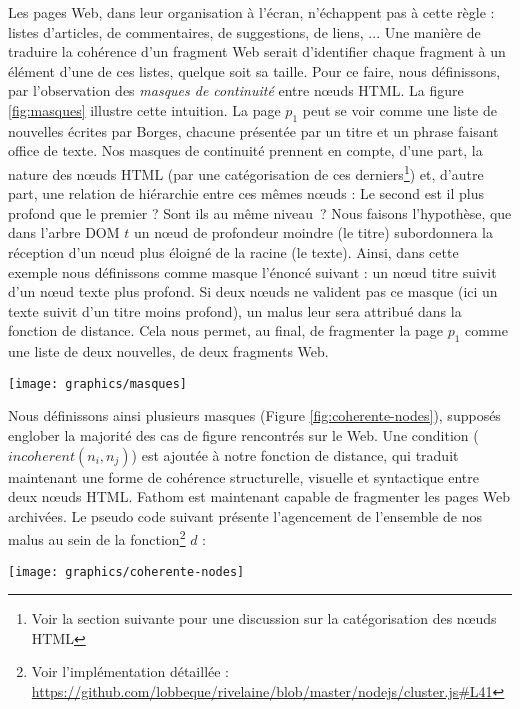 \documentclass[symmetric,justified,marginals=raggedouter]{tufte-book}
\begin{document}
Les pages Web, dans leur organisation à l'écran, n'échappent pas à cette règle : listes d'articles, de commentaires, de suggestions, de liens, ... Une manière de traduire la cohérence d'un fragment Web serait d'identifier chaque fragment à un élément d'une de ces listes, quelque soit sa taille. Pour ce faire, nous définissons, par l'observation des \textit{masques de continuité} entre nœuds HTML. La figure \ref{fig:masques} illustre cette intuition. La page $p_1$ peut se voir comme une liste de nouvelles écrites par Borges, chacune présentée par un titre et un phrase faisant office de texte. Nos masques de continuité prennent en compte, d'une part, la nature des nœuds HTML (par une catégorisation de ces derniers\footnote{Voir la section suivante pour une discussion sur la catégorisation des nœuds HTML}) et, d'autre part, une relation de hiérarchie entre ces mêmes nœuds : Le second est il plus profond que le premier ? Sont ils au même niveau~? Nous faisons l'hypothèse, que dans l'arbre DOM $t$ un nœud de profondeur moindre (le titre) subordonnera la réception d'un nœud plus éloigné de la racine (le texte). Ainsi, dans cette exemple nous définissons comme masque l'énoncé suivant : un nœud titre suivit d'un nœud texte plus profond. Si deux nœuds ne valident pas ce masque (ici un texte suivit d'un titre moins profond), un malus leur sera attribué dans la fonction de distance. Cela nous permet, au final, de fragmenter la page $p_1$ comme une liste de deux nouvelles, de deux fragments Web. 

\begin{figure*}%
  \texttt{[image: graphics/masques]}
  \caption{Ségmentation d'une page Web suivant des masques de continuité}
  \label{fig:masques}
\end{figure*}

\noindent Nous définissons ainsi plusieurs masques (Figure \ref{fig:coherente-nodes}), supposés englober la majorité des cas de figure rencontrés sur le Web. Une condition ($incoherent(n_i,n_j)$) est ajoutée à notre fonction de distance, qui traduit maintenant une forme de cohérence structurelle, visuelle et syntactique entre deux nœuds HTML. Fathom est maintenant capable de fragmenter les pages Web archivées. Le pseudo code suivant présente l'agencement de l'ensemble de nos malus au sein de la fonction\footnote{Voir l'implémentation détaillée : \url{https://github.com/lobbeque/rivelaine/blob/master/nodejs/cluster.js\#L41}} $d$ :

\newpage

\begin{marginfigure}%
  \texttt{[image: graphics/coherente-nodes]}
  \vspace*{0.2cm}  
  \caption{Masques de continuité entre deux types de nœuds HTML de profondeur variable}
  \label{fig:coherente-nodes}
\end{marginfigure}
\end{document}

